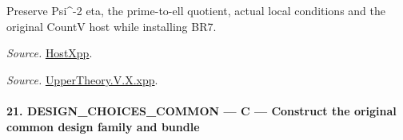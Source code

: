 \documentclass[11pt,a4paper]{article}
\numberwithin{equation}{section}
\theoremstyle{remark}\newtheorem{remark}[theorem]{Remark}
\begin{document}
Preserve Psi\textasciicircum{}-2 eta, the prime-to-ell quotient, actual local conditions and the original CountV host while installing BR7.

\emph{Source.} \href{https://github.com/CocoSgt/riemann-hypothesis-lean/blob/7cbf7a0c32fca1badf05931879a37c3f8a2b03b4/src/Development/AutomorphicArithmetic/AutomorphicVarieties/UnitaryThreeDeformations/HostNumber.lean#L14-L17}{HostXpp}.

\emph{Source.} \href{https://github.com/CocoSgt/riemann-hypothesis-lean/blob/7cbf7a0c32fca1badf05931879a37c3f8a2b03b4/src/Development/AutomorphicArithmetic/AutomorphicVarieties/LevelCohomology/Xpp.lean#L11-L84}{UpperTheory.V.X.xpp}.



\paragraph{21. DESIGN\_\allowbreak CHOICES\_\allowbreak COMMON — C — Construct the original common design family and bundle}
\end{document}
